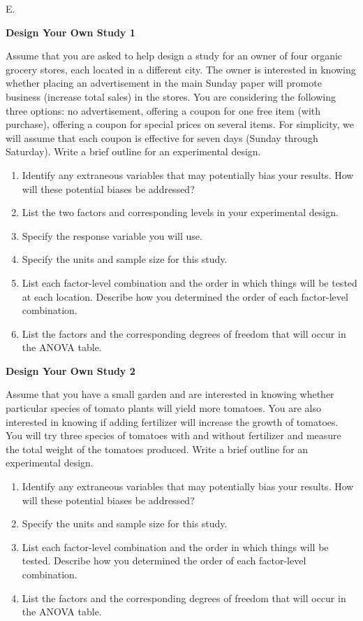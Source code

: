 \documentclass[
]{report}
\newcounter{excount}
\renewcommand{\theexcount}{E\arabic{excount}}
\begin{document}
\begin{list}{\theexcount.}{ \setlength{\itemsep}{1.2em}}

  \item \textbf{Design Your Own Study 1}

Assume that you are asked to help design a study for an owner of four organic grocery stores, each located in a different city. The owner is interested in knowing whether placing an advertisement in the main Sunday paper will promote business (increase total sales) in the stores. You are considering the following three options: no advertisement, offering a coupon for one free item (with purchase), offering a coupon for special prices on several items. For simplicity, we will assume that each coupon is effective for seven days (Sunday through Saturday). Write a brief outline for an experimental design.
  \begin{enumerate}
    \item Identify any extraneous variables that may potentially bias your results. How will these potential biases be addressed?
    \item List the two factors and corresponding levels in your experimental design.
    \item Specify the response variable you will use.
    \item Specify the units and sample size for this study.
    \item List each factor-level combination and the order in which things will be tested at each location. Describe how you determined the order of each factor-level combination.
    \item List the factors and the corresponding degrees of freedom that will occur in the ANOVA table.
  \end{enumerate}

  \item \textbf{Design Your Own Study 2}

Assume that you have a small garden and are interested in knowing whether particular species of tomato plants will yield more tomatoes. You are also interested in knowing if adding fertilizer will increase the growth of tomatoes. You will try three species of tomatoes with and without fertilizer and measure the total weight of the tomatoes produced. Write a brief outline for an experimental design.
  \begin{enumerate}
    \item Identify any extraneous variables that may potentially bias your results. How will these potential biases be addressed?
    \item Specify the units and sample size for this study.
    \item List each factor-level combination and the order in which things will be tested. Describe how you determined the order of each factor-level combination.
    \item List the factors and the corresponding degrees of freedom that will occur in the ANOVA table.
  \end{enumerate}


\end{list}
\end{document}
